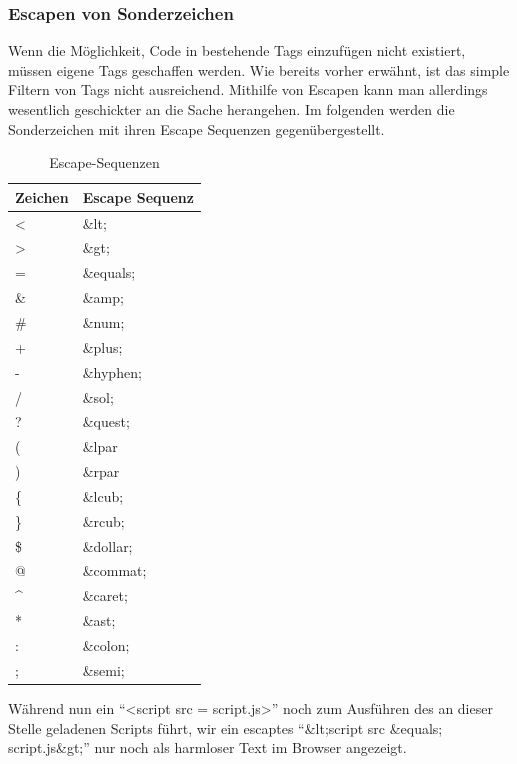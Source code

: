 \subsubsection{Escapen von Sonderzeichen}
Wenn die M\"oglichkeit, Code in bestehende Tags einzuf\"ugen nicht existiert, m\"ussen eigene Tags geschaffen werden. Wie bereits vorher erw\"ahnt, ist das simple Filtern von Tags nicht ausreichend. Mithilfe von Escapen kann man allerdings wesentlich geschickter an die Sache herangehen. Im folgenden werden die Sonderzeichen mit ihren Escape Sequenzen gegen\"ubergestellt.\\
\begin{table}[H]
\centering
\begin{tabular}{|l|l|}
\hline Zeichen & Escape Sequenz \\ 
\hline < & \&lt; \\ 
\hline > & \&gt; \\ 
\hline = & \&equals; \\ 
\hline \& & \&amp; \\ 
\hline \# & \&num; \\ 
\hline + & \&plus; \\ 
\hline - & \&hyphen; \\ 
\hline / & \&sol; \\ 
\hline ? & \&quest; \\ 
\hline ( & \&lpar \\ 
\hline ) & \&rpar \\ 
\hline {\{} & \&lcub; \\ 
\hline {\}} & \&rcub; \\ 
\hline {\$} & \&dollar; \\ 
\hline @ & \&commat; \\ 
\hline \textasciicircum & \&caret; \\ 
\hline * & \&ast; \\ 
\hline : & \&colon; \\ 
\hline ; & \&semi; \\ 
\hline 
\end{tabular} 
\caption{Escape-Sequenzen \cite{xssBuch}}
\label{escape-sequenzen}
\end{table}

W\"ahrend nun ein ``<script src = script.js>'' noch zum Ausf\"uhren des an dieser Stelle geladenen Scripts f\"uhrt, wir ein escaptes ``\&lt;script src \&equals; script.js\&gt;'' nur noch als harmloser Text im Browser angezeigt.
\cite{xssBuch}

\clearpage
